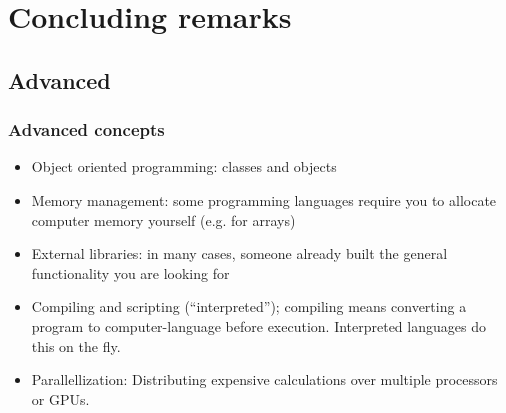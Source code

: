 



\section{Concluding remarks}
\subsection*{Advanced}
\begin{frame}
  \frametitle{Advanced concepts}
  \begin{itemize}
    \item Object oriented programming: classes and objects
    \item Memory management: some programming languages require you to allocate computer memory yourself (e.g. for arrays)
    \item External libraries: in many cases, someone already built the general functionality you are looking for
    \item Compiling and scripting (``interpreted''); compiling means converting a program to computer-language before execution. Interpreted languages do this on the fly.
    \item Parallellization: Distributing expensive calculations over multiple processors or GPUs.
  \end{itemize}\pause
 \end{frame}

